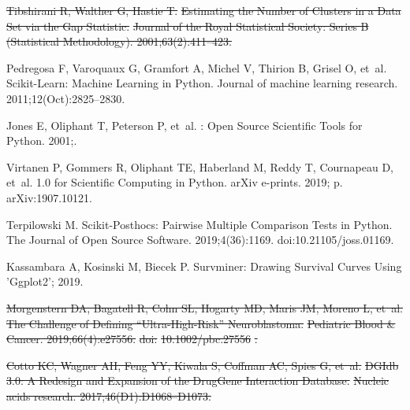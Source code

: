 \documentclass[10pt,letterpaper]{article}
\providecommand{\DIFdeltex}[1]{{\protect\color{red}\sout{#1}}}                      %
\providecommand{\DIFdelbegin}{} %
\providecommand{\DIFdelend}{} %
\providecommand{\DIFdel}[1]{\texorpdfstring{\DIFdeltex{#1}}{}} %
\newcommand{\DIFscaledelfig}{0.5}
\newlength{\DIFdelgraphicswidth} %
\newlength{\DIFdelgraphicsheight} %
\newcommand{\DIFdelincludegraphics}[2][]{%
\sbox{\DIFdelgraphicsbox}{\DIFOincludegraphics[#1]{#2}}%
\settoboxwidth{\DIFdelgraphicswidth}{\DIFdelgraphicsbox} %
\settoboxtotalheight{\DIFdelgraphicsheight}{\DIFdelgraphicsbox} %
\scalebox{\DIFscaledelfig}{%
\parbox[b]{\DIFdelgraphicswidth}{\usebox{\DIFdelgraphicsbox}\\[-\baselineskip] \rule{\DIFdelgraphicswidth}{0em}}\llap{\resizebox{\DIFdelgraphicswidth}{\DIFdelgraphicsheight}{%
\setlength{\unitlength}{\DIFdelgraphicswidth}%
\begin{picture}(1,1)%
\thicklines\linethickness{2pt} %
{\color[rgb]{1,0,0}\put(0,0){\framebox(1,1){}}}%
{\color[rgb]{1,0,0}\put(0,0){\line( 1,1){1}}}%
{\color[rgb]{1,0,0}\put(0,1){\line(1,-1){1}}}%
\end{picture}%
}\hspace*{3pt}}} %
} %
\DeclareRobustCommand{\DIFdelbegin}{\DIFOdelbegin \let\includegraphics\DIFdelincludegraphics} %
\DeclareRobustCommand{\DIFdelend}{\DIFOaddend \let\includegraphics\DIFOincludegraphics} %
\begin{document}
\begin{thebibliography}{10}
\DIFdel{Tibshirani R, Walther G, Hastie T.
	}%
\DIFdel{Estimating the Number of Clusters in a Data Set via the Gap
	Statistic.
	}%
\DIFdel{Journal of the Royal Statistical Society: Series B (Statistical
	Methodology). 2001;63(2):411--423.
	}%

\DIFdelend {}
	Pedregosa F, Varoquaux G, Gramfort A, Michel V, Thirion B, Grisel O, et~al.
	\newblock Scikit-Learn: Machine Learning in Python.
	\newblock Journal of machine learning research. 2011;12(Oct):2825--2830.

	Jones E, Oliphant T, Peterson P, et~al.
	: {{Open}} Source Scientific Tools for {{Python}}. 2001;.

	Virtanen P, Gommers R, Oliphant TE, Haberland M, Reddy T, Cournapeau D, et~al.
	 1.0 for {{Scientific
			Computing}} in {{Python}}.
	\newblock arXiv e-prints. 2019; p. arXiv:1907.10121.

	Terpilowski M.
	\newblock Scikit-Posthocs: {{Pairwise}} Multiple Comparison Tests in
	{{Python}}.
	\newblock The Journal of Open Source Software. 2019;4(36):1169.
	\newblock doi:{10.21105/joss.01169}.

	Kassambara A, Kosinski M, Biecek P.
	\newblock Survminer: Drawing Survival Curves Using 'Ggplot2'; 2019.
	\DIFdelbegin %

\DIFdel{Morgenstern DA, Bagatell R, Cohn SL, Hogarty MD, Maris JM, Moreno L, et~al.
	}%
\DIFdel{The Challenge of Defining ``Ultra-High-Risk'' Neuroblastoma.
	}%
\DIFdel{Pediatric Blood \& Cancer. 2019;66(4):e27556.
	}%
\DIFdel{doi:}%
\DIFdel{10.1002/pbc.27556}%
\DIFdel{.
	}%

\DIFdel{Cotto KC, Wagner AH, Feng YY, Kiwala S, Coffman AC, Spies G, et~al.
	}%
\DIFdel{DGIdb}%
\DIFdel{3.0: A Redesign and Expansion of the Drug\textendash{}Gene
	Interaction Database.
	}%
\DIFdel{Nucleic acids research. 2017;46(D1):D1068--D1073.
	}%


\end{thebibliography}
\end{document}
